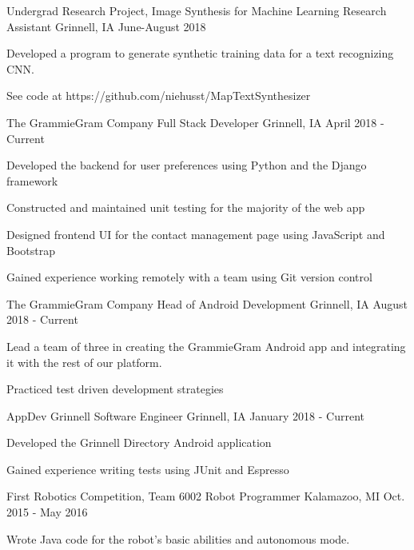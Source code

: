 \documentclass[11pt, a4paper]{awesome-cv}
\begin{document}
\begin{cventries}

  \cventry
    {Undergrad Research Project, Image Synthesis for Machine Learning}
    {Research Assistant}
    {Grinnell, IA}
    {June-August 2018}
    {
      \begin{cvitems}
        \item {Developed a program to generate synthetic training data for a text recognizing CNN.}
        \item{See code at https://github.com/niehusst/MapTextSynthesizer}
      \end{cvitems}
    }

  \cventry
    {The GrammieGram Company}
    {Full Stack Developer}
    {Grinnell, IA}
    {April 2018 - Current}
    {
      \begin{cvitems}
        \item {Developed the backend for user preferences using Python and the Django framework}
        \item {Constructed and maintained unit testing for the majority of the web app}
        \item {Designed frontend UI for the contact management page using JavaScript and Bootstrap}
        \item {Gained experience working remotely with a team using Git version control}
      \end{cvitems}
    }

  \cventry
    {The GrammieGram Company}
    {Head of Android Development}
    {Grinnell, IA}
    {August 2018 - Current}
    {
      \begin{cvitems}
        \item {Lead a team of three in creating the GrammieGram Android app and integrating it with the rest of our platform.}
	\item {Practiced test driven development strategies}
      \end{cvitems}
    }

  \cventry
    {AppDev Grinnell}
    {Software Engineer}
    {Grinnell, IA}
    {January 2018 - Current}
    {
      \begin{cvitems}
        \item {Developed the Grinnell Directory Android application}
	\item {Gained experience writing tests using JUnit and Espresso}
      \end{cvitems}
    }

  \cventry
    {First Robotics Competition, Team 6002}
    {Robot Programmer}
    {Kalamazoo, MI}
    {Oct. 2015 - May 2016}
    {
      \begin{cvitems}
        \item {Wrote Java code for the robot’s basic abilities and autonomous mode.}
      \end{cvitems}
    }

\end{cventries}
\end{document}
